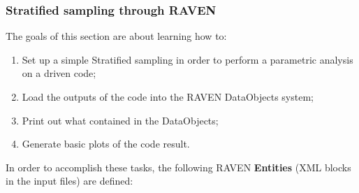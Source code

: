 \subsubsection{Stratified sampling through RAVEN}
\label{subsub:Stratifiedexample}
The goals of this section are about learning how to:
 \begin{enumerate}
   \item Set up a simple Stratified sampling in order to perform a parametric analysis on a driven code;
   \item Load the outputs of the code into the RAVEN DataObjects system;
   \item Print out what contained in the DataObjects;
   \item Generate basic plots of the code result.
\end{enumerate}  
In order to accomplish these tasks, the following RAVEN \textbf{Entities} (XML blocks in the input files) are defined:
